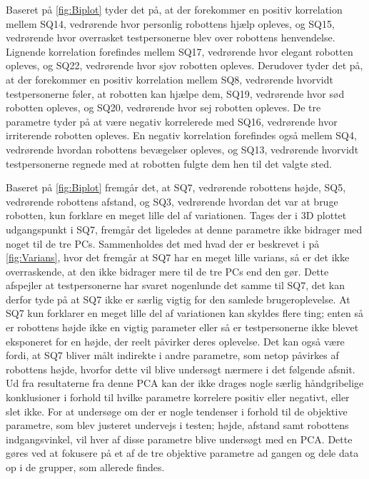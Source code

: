 \noindent
%
Baseret på \autoref{fig:Biplot} tyder det på, at der forekommer en positiv korrelation mellem SQ14, vedrørende hvor personlig robottens hjælp opleves, og SQ15, vedrørende hvor overrasket testpersonerne blev over robottens henvendelse. Lignende korrelation forefindes mellem SQ17, vedrørende hvor elegant robotten opleves, og SQ22, vedrørende hvor sjov robotten opleves. Derudover tyder det på, at der forekommer en positiv korrelation mellem SQ8, vedrørende hvorvidt testpersonerne føler, at robotten kan hjælpe dem, SQ19, vedrørende hvor sød robotten opleves, og SQ20, vedrørende hvor sej robotten opleves. De tre parametre tyder på at være negativ korrelerede med SQ16, vedrørende hvor irriterende robotten opleves. En negativ korrelation forefindes også mellem SQ4, vedrørende hvordan robottens bevægelser opleves, og SQ13, vedrørende hvorvidt testpersonerne regnede med at robotten fulgte dem hen til det valgte sted. 

Baseret på \autoref{fig:Biplot} fremgår det, at SQ7, vedrørende robottens højde, SQ5, vedrørende robottens afstand, og SQ3, vedrørende hvordan det var at bruge robotten, kun forklare en meget lille del af variationen. Tages der i 3D plottet udgangspunkt i SQ7, fremgår det ligeledes at denne parametre ikke bidrager med noget til de tre PCs. Sammenholdes det med hvad der er beskrevet i  på \autoref{fig:Varians}, hvor det fremgår at SQ7 har en meget lille varians, så er det ikke overraskende, at den ikke bidrager mere til de tre PCs end den gør. Dette afspejler at testpersonerne har svaret nogenlunde det samme til SQ7, det kan derfor tyde på at SQ7 ikke er særlig vigtig for den samlede brugeroplevelse. At SQ7 kun forklarer en meget lille del af variationen kan skyldes flere ting; enten så er robottens højde ikke en vigtig parameter eller så er testpersonerne ikke blevet eksponeret for en højde, der reelt påvirker deres oplevelse. Det kan også være fordi, at SQ7 bliver målt indirekte i andre parametre, som netop påvirkes af robottens højde, hvorfor dette vil blive undersøgt nærmere i det følgende afsnit.\blankline
%
Ud fra resultaterne fra denne PCA kan der ikke drages nogle særlig håndgribelige konklusioner i forhold til hvilke parametre korrelere positiv eller negativt, eller slet ikke. For at undersøge om der er nogle tendenser i forhold til de objektive parametre, som blev justeret undervejs i testen; højde, afstand samt robottens indgangsvinkel, vil hver af disse parametre blive undersøgt med en PCA. Dette gøres ved at fokusere på et af de tre objektive parametre ad gangen og dele data op i de grupper, som allerede findes.




